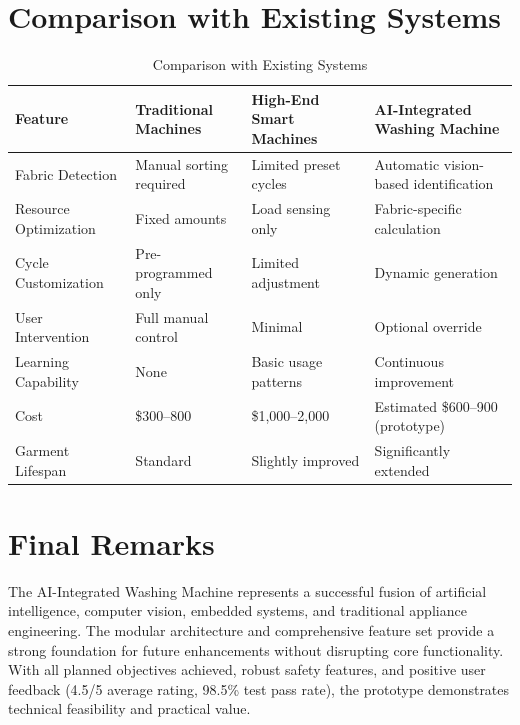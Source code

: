\section{Comparison with Existing Systems}

\begin{table}[H]
    \centering
    \small
    \begin{tabular}{|p{3cm}|p{3cm}|p{3.5cm}|p{3.5cm}|}
        \hline
        \textbf{Feature} & \textbf{Traditional Machines} & \textbf{High-End Smart Machines} & \textbf{AI-Integrated Washing Machine} \\
        \hline
        Fabric Detection & Manual sorting required & Limited preset cycles & Automatic vision-based identification \\
        \hline
        Resource Optimization & Fixed amounts & Load sensing only & Fabric-specific calculation \\
        \hline
        Cycle Customization & Pre-programmed only & Limited adjustment & Dynamic generation \\
        \hline
        User Intervention & Full manual control & Minimal & Optional override \\
        \hline
        Learning Capability & None & Basic usage patterns & Continuous improvement \\
        \hline
        Cost & \$300--800 & \$1,000--2,000 & Estimated \$600--900 (prototype) \\
        \hline
        Garment Lifespan & Standard & Slightly improved & Significantly extended \\
        \hline
    \end{tabular}
    \caption{Comparison with Existing Systems}
    \label{tab:comparison}
\end{table}

\section{Final Remarks}
The AI-Integrated Washing Machine represents a successful fusion of artificial intelligence, computer vision, embedded systems, and traditional appliance engineering. The modular architecture and comprehensive feature set provide a strong foundation for future enhancements without disrupting core functionality. With all planned objectives achieved, robust safety features, and positive user feedback (4.5/5 average rating, 98.5\% test pass rate), the prototype demonstrates technical feasibility and practical value.

